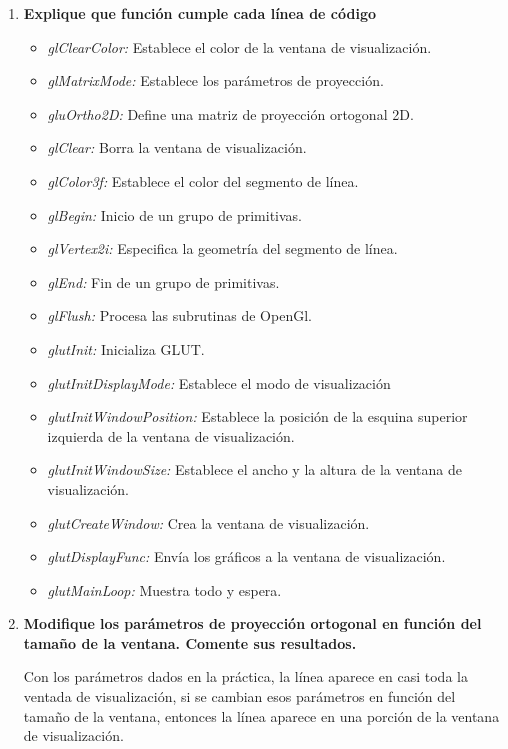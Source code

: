 \documentclass[a4paper,12pt]{article}
\begin{document}
\begin{enumerate}
 \item \textbf{Explique que función cumple cada línea de código}
 \begin{itemize}
  \item \textit{glClearColor:} Establece el color de la ventana de visualización.
  \item \textit{glMatrixMode:} Establece los parámetros de proyección.
  \item \textit{gluOrtho2D:} Define una matriz de proyección ortogonal 2D.
  \item \textit{glClear:} Borra la ventana de visualización.
  \item \textit{glColor3f:} Establece el color del segmento de línea.
  \item \textit{glBegin:} Inicio de un grupo de primitivas.
  \item \textit{glVertex2i:} Especifica la geometría del segmento de línea.
  \item \textit{glEnd:} Fin de un grupo de primitivas.
  \item \textit{glFlush:} Procesa las subrutinas de OpenGl.
  \item \textit{glutInit:} Inicializa GLUT.
  \item \textit{glutInitDisplayMode:} Establece el modo de visualización
  \item \textit{glutInitWindowPosition:} Establece la posición de la esquina superior izquierda de la ventana de visualización.
  \item \textit{glutInitWindowSize:} Establece el ancho y la altura de la ventana de visualización.
  \item \textit{glutCreateWindow:} Crea la ventana de visualización.
  \item \textit{glutDisplayFunc:} Envía los gráficos a la ventana de visualización.
  \item \textit{glutMainLoop:} Muestra todo y espera. 
 \end{itemize}

 \item \textbf{Modifique los parámetros de proyección ortogonal en función del tamaño de la ventana. Comente sus resultados.}
 
 Con los parámetros dados en la práctica, la línea aparece en casi toda la ventada de visualización, si se cambian esos parámetros en
 función del tamaño de la ventana, entonces la línea aparece en una porción de la ventana de visualización.
 

\end{enumerate}
\end{document}
